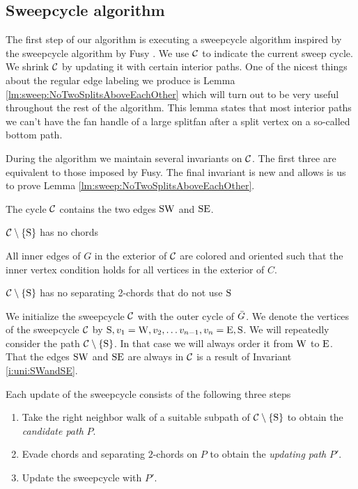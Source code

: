 
\subsection{Sweepcycle algorithm}
\thispagestyle{plain}
\label{ss:sweep}
The first step of our algorithm is executing a sweepcycle algorithm inspired by the sweepcycle algorithm by Fusy \cite{Fusy2006}. We use $\mathcal{C}$ to indicate the current sweep cycle. We shrink $\mathcal{C}$ by updating it with certain interior paths.
One of the nicest things about the regular edge labeling we produce is Lemma \ref{lm:sweep:NoTwoSplitsAboveEachOther} which will turn out to be very useful throughout the rest of the algorithm. This lemma states that most interior paths we can't have the fan handle of a large splitfan after a split vertex on a so-called bottom path. 

During the algorithm we maintain several invariants on $\mathcal{C}$. The first three are equivalent to those imposed by Fusy. The final invariant is new and allows is us to prove Lemma \ref{lm:sweep:NoTwoSplitsAboveEachOther}.

\begin{invariants}
  \itemsep=-4pt

  \item \label{i:uni:SWandSE} The cycle $\mathcal{C}$ contains the two edges $\mathrm{S} \mathrm{W}$ and $\mathrm{S} \mathrm{E}$.
  \item \label{i:uni:noChords} $\mathcal{C} \setminus \left\lbrace {\mathrm{S}} \right\rbrace$ has no chords
  \item \label{i:uni:intVertCond} All inner edges of $G$ in the exterior of $\mathcal{C}$ are colored and oriented such that the inner vertex condition holds for all vertices in the exterior of $C$.
  \item \label{i:uni:no2Chords} $\mathcal{C}\setminus \left\lbrace {\mathrm{S}} \right\rbrace$ has no separating 2-chords that do not use $\mathrm{S}$
\end{invariants}

We initialize the sweepcycle $\mathcal{C}$ with the outer cycle of $\bar{G}$.
We denote the vertices of the sweepcycle $\mathcal{C}$ by $\mathrm{S}, v_1 = \mathrm{W}, v_2, \ldots v_{n-1}, v_n = \mathrm{E}, \mathrm{S}$.   We will repeatedly consider the path $\mathcal{C} \setminus \left\lbrace {\mathrm{S}} \right\rbrace$. In that case we will always order it from $\mathrm{W}$ to $\mathrm{E}$. That the edges $\mathrm{S} \mathrm{W}$ and $\mathrm{S} \mathrm{E}$ are always in $\mathcal{C}$ is a result of Invariant \ref{i:uni:SWandSE}.


Each update of the sweepcycle consists of the following three steps
\begin{enumerate}
  \itemsep=-4pt
  \item Take the right neighbor walk of a suitable subpath of $\mathcal{C} \setminus \left\lbrace {\mathrm{S}} \right\rbrace$ to obtain the \emph{candidate path} $P$.
  \item Evade chords and separating $2$-chords on $P$ to obtain the \emph{updating path} $P'$.
  \item Update the sweepcycle with $P'$.
\end{enumerate}

